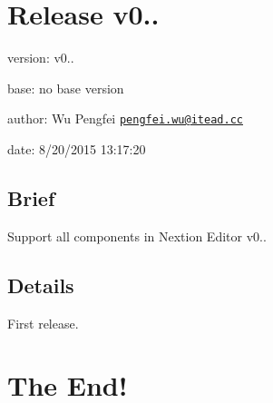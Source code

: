 



\section*{Release v0..}


\begin{DoxyItemize}
\item version\+: v0..
\item base\+: no base version
\item author\+: Wu Pengfei \href{mailto:pengfei.wu@itead.cc}{\tt pengfei.\+wu@itead.\+cc}
\item date\+: 8/20/2015 13\+:17\+:20
\end{DoxyItemize}

\subsection*{Brief}

Support all components in Nextion Editor v0..

\subsection*{Details}

First release.





\section*{The End!}



 